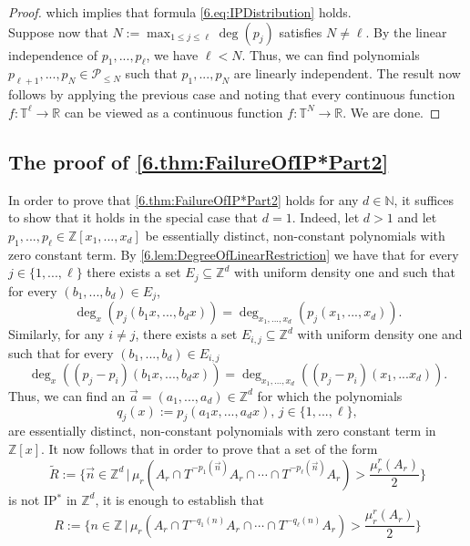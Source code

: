 \documentclass[11pt,american,preprint]{elsarticle}
\numberwithin{equation}{section}
\theoremstyle{plain}
\theoremstyle{plain*}
\theoremstyle{plain}
\theoremstyle{plain*}
\theoremstyle{plain}
\theoremstyle{plain*}
\theoremstyle{remark}
\theoremstyle{remark*}
\theoremstyle{remark}
\theoremstyle{remark*}
\theoremstyle{remark}
\theoremstyle{remark*}
\theoremstyle{plain}
\theoremstyle{definition}
\theoremstyle{plain}
\theoremstyle{plain} %
\newcommand{\R}{\mathbb{R}}
\newcommand{\N}{\mathbb{N}}
\newcommand{\Z}{\mathbb{Z}}
\begin{document}
\begin{proof}
which implies that formula \eqref{6.eq:IPDistribution} holds.\\

 Suppose now that $N:= \max_{1\leq j\leq \ell}\deg(p_j)$ satisfies $N\neq \ell$.  By the linear independence of $p_1,...,p_\ell$, we have $\ell< N$. Thus, we can find polynomials $p_{\ell+1},...,p_N\in \mathcal P_{\leq N}$ such that $p_1,...,p_N$ are linearly independent. The result now follows by applying the previous case and noting that every continuous function $f:\mathbb T^\ell\rightarrow \R$ can be viewed as a continuous function $f:\mathbb T^N\rightarrow \R$. We are done.  
\end{proof}
\subsection{The proof of \cref{6.thm:FailureOfIP*Part2}}
In order to prove that \cref{6.thm:FailureOfIP*Part2} holds for any $d\in\N$, it suffices to show that it holds in the special case that $d=1$. Indeed, let $d>1$ and let $p_1,...,p_\ell\in\Z[x_1,...,x_d]$ be  essentially distinct, non-constant  polynomials with zero constant term. By \cref{6.lem:DegreeOfLinearRestriction} we have that for every $j\in\{1,...,\ell\}$ there exists a set  $E_j\subseteq \Z^d$  with uniform density one and such that for every $(b_1,...,b_d)\in E_j$,
    $$\deg_x(p_j(b_1x,...,b_dx))=\deg_{x_1,...,x_d}(p_j(x_1,...,x_d)).$$
    Similarly, for any $i\neq j$, there exists a set $E_{i,j}\subseteq \Z^d$ with uniform density one and such that for every $(b_1,...,b_d)\in E_{i,j}$
    $$\deg_x((p_j-p_i)(b_1x,...,b_dx))=\deg_{x_1,...,x_d}((p_j-p_i)(x_1,...x_d)).$$
    Thus, we can find an $\vec a=(a_1,...,a_d)\in\Z^d$ for which the polynomials
    \begin{equation}
        q_j(x):=p_j(a_1x,...,a_dx),\,j\in\{1,...,\ell\},
    \end{equation}
    are essentially distinct, non-constant polynomials with zero constant term in $\Z[x]$. It now follows that in order to prove that a set of the form 
    $$
    \tilde R:=\{\vec n\in\Z^d\,|\,\mu_r(A_r\cap T^{-p_1(\vec n)}A_r\cap \cdots\cap T^{-p_\ell(\vec n)}A_r)>\frac{\mu_r^r(A_r)}{2}\}
    $$
    is not IP$^*$ in  $\Z^d$, it is enough to establish that 
    \begin{equation}\label{7.eq:WantToshow}
R:=\{ n\in\Z\,|\,\mu_r(A_r\cap T^{-q_1(n)}A_r\cap \cdots\cap T^{-q_\ell(n)}A_r)>\frac{\mu_r^r(A_r)}{2}\}
\end{equation}
\end{document}
